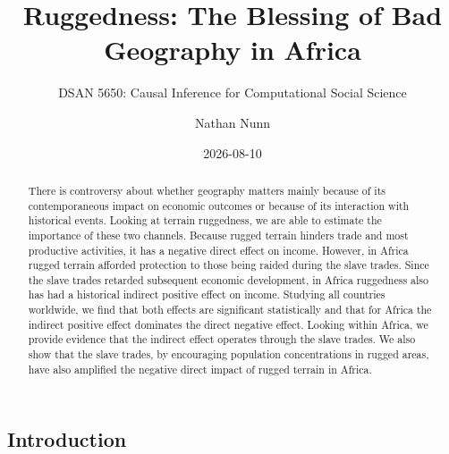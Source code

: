 \documentclass[
  letterpaper,
  DIV=11,
  numbers=noendperiod]{scrartcl}
\title{Ruggedness: The Blessing of Bad Geography in Africa}
\subtitle{DSAN 5650: Causal Inference for Computational Social Science}
\author{Nathan Nunn}
\date{2026-08-10}
\begin{document}
\maketitle
\begin{abstract}
There is controversy about whether geography matters mainly because of
its contemporaneous impact on economic outcomes or because of its
interaction with historical events. Looking at terrain ruggedness, we
are able to estimate the importance of these two channels. Because
rugged terrain hinders trade and most productive activities, it has a
negative direct effect on income. However, in Africa rugged terrain
afforded protection to those being raided during the slave trades. Since
the slave trades retarded subsequent economic development, in Africa
ruggedness also has had a historical indirect positive effect on income.
Studying all countries worldwide, we find that both effects are
significant statistically and that for Africa the indirect positive
effect dominates the direct negative effect. Looking within Africa, we
provide evidence that the indirect effect operates through the slave
trades. We also show that the slave trades, by encouraging population
concentrations in rugged areas, have also amplified the negative direct
impact of rugged terrain in Africa.
\end{abstract}


\subsection{Introduction}\label{sec-1}
\end{document}
